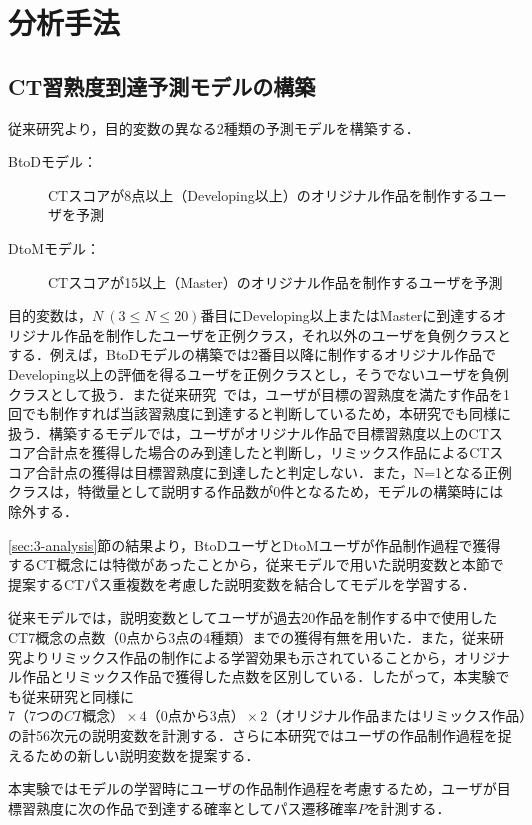 \documentclass[submit,ses,noauthor]{ipsj}
\begin{document}
\section{分析手法}
\subsection{CT習熟度到達予測モデルの構築}
従来研究より，目的変数の異なる2種類の予測モデルを構築する．

\begin{description}
\item [BtoDモデル：]CTスコアが8点以上（Developing以上）のオリジナル作品を制作するユーザを予測
\item [DtoMモデル：]CTスコアが15以上（Master）のオリジナル作品を制作するユーザを予測
\end{description}

目的変数は，{$N~(3 \leq N \leq 20)$}番目にDeveloping以上またはMasterに到達するオリジナル作品を制作したユーザを正例クラス，それ以外のユーザを負例クラスとする．例えば，BtoDモデルの構築では2番目以降に制作するオリジナル作品でDeveloping以上の評価を得るユーザを正例クラスとし，そうでないユーザを負例クラスとして扱う．また従来研究~\cite{Ando_2021}では，ユーザが目標の習熟度を満たす作品を1回でも制作すれば当該習熟度に到達すると判断しているため，本研究でも同様に扱う．構築するモデルでは，ユーザがオリジナル作品で目標習熟度以上のCTスコア合計点を獲得した場合のみ到達したと判断し，リミックス作品によるCTスコア合計点の獲得は目標習熟度に到達したと判定しない．また，N=1となる正例クラスは，特徴量として説明する作品数が0件となるため，モデルの構築時には除外する．

\ref{sec:3-analysis}節の結果より，BtoDユーザとDtoMユーザが作品制作過程で獲得するCT概念には特徴があったことから，従来モデルで用いた説明変数と本節で提案するCTパス重複数を考慮した説明変数を結合してモデルを学習する．

従来モデルでは，説明変数としてユーザが過去20作品を制作する中で使用したCT7概念の点数（0点から3点の4種類）までの獲得有無を用いた．また，従来研究\cite{Dasgupta_2016}よりリミックス作品の制作による学習効果も示されていることから，オリジナル作品とリミックス作品で獲得した点数を区別している．したがって，本実験でも従来研究と同様に$7（7つのCT概念） \times 4（0点から3点） \times 2（オリジナル作品またはリミックス作品）$の計56次元の説明変数を計測する．さらに本研究ではユーザの作品制作過程を捉えるための新しい説明変数を提案する．

本実験ではモデルの学習時にユーザの作品制作過程を考慮するため，ユーザが目標習熟度に次の作品で到達する確率としてパス遷移確率$P$を計測する．
\end{document}
